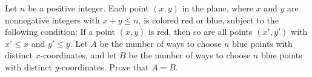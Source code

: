 Let $n$ be a positive integer. Each point $(x, y)$ in the plane, where $x$ and $y$ are nonnegative integers with $x + y \leq n$, is colored red or blue, subject to the following condition: If a point $(x, y)$ is red, then so are all points $(x', y')$ with $x' \leq x$ and $y' \leq y$. Let $A$ be the number of ways to choose $n$ blue points with distinct $x$-coordinates, and let $B$ be the number of ways to choose $n$ blue points with distinct $y$-coordinates. Prove that $A = B$.
